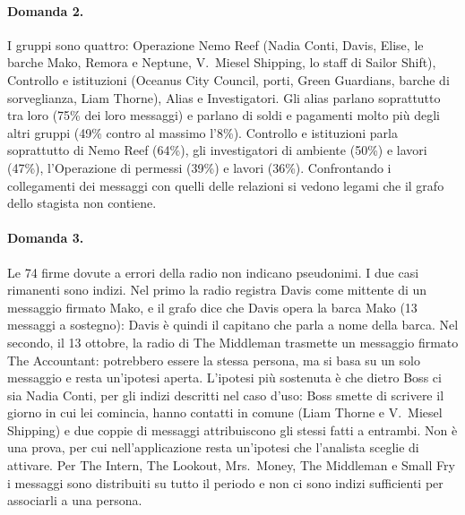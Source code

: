 \documentclass[11pt,a4paper]{article}
\begin{document}
\paragraph{Domanda 2.} I gruppi sono quattro: Operazione Nemo Reef (Nadia Conti, Davis, Elise, le barche Mako,
Remora e Neptune, V.\ Miesel Shipping, lo staff di Sailor Shift), Controllo e istituzioni (Oceanus City Council,
porti, Green Guardians, barche di sorveglianza, Liam Thorne), Alias e Investigatori. Gli alias parlano
soprattutto tra loro (75\% dei loro messaggi) e parlano di soldi e pagamenti molto più degli altri gruppi (49\%
contro al massimo l'8\%). Controllo e istituzioni parla soprattutto di Nemo Reef (64\%), gli investigatori di
ambiente (50\%) e lavori (47\%), l'Operazione di permessi (39\%) e lavori (36\%). Confrontando i collegamenti dei
messaggi con quelli delle relazioni si vedono legami che il grafo dello stagista non contiene.

\paragraph{Domanda 3.}\label{sec:q3} Le 74 firme dovute a errori della radio non indicano pseudonimi. I due casi
rimanenti sono indizi. Nel primo la radio registra Davis come mittente di un messaggio firmato Mako, e il grafo
dice che Davis opera la barca Mako (13 messaggi a sostegno): Davis è quindi il capitano che parla a nome della
barca. Nel secondo, il 13 ottobre, la radio di The Middleman trasmette un messaggio firmato The Accountant:
potrebbero essere la stessa persona, ma si basa su un solo messaggio e resta un'ipotesi aperta. L'ipotesi più
sostenuta è che dietro Boss ci sia Nadia Conti, per gli indizi descritti nel caso d'uso: Boss smette di scrivere il
giorno in cui lei comincia, hanno contatti in comune (Liam Thorne e V.\ Miesel Shipping) e due coppie di messaggi
attribuiscono gli stessi fatti a entrambi. Non è una prova, per cui nell'applicazione resta un'ipotesi che
l'analista sceglie di attivare. Per The Intern, The Lookout, Mrs.\ Money, The Middleman e Small Fry i messaggi sono
distribuiti su tutto il periodo e non ci sono indizi sufficienti per associarli a una persona.
\end{document}
